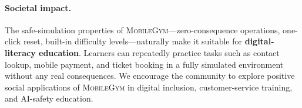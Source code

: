 \documentclass[11pt]{article}
\newcommand{\sys}{\textsc{MobileGym}}
\begin{document}
\paragraph{Societal impact.} The safe-simulation properties of \sys{}—zero-consequence operations, one-click reset, built-in difficulty levels—naturally make it suitable for \textbf{digital-literacy education}. Learners can repeatedly practice tasks such as contact lookup, mobile payment, and ticket booking in a fully simulated environment without any real consequences. We encourage the community to explore positive social applications of \sys{} in digital inclusion, customer-service training, and AI-safety education.





\end{document}
